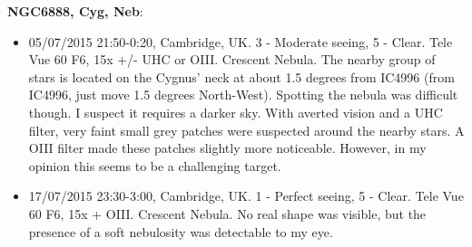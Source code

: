 {\bf NGC6888, Cyg, Neb}:
\begin{itemize}
\item 05/07/2015 21:50-0:20, Cambridge, UK. 3 - Moderate seeing, 5 - Clear. Tele Vue 60 F6, 15x +/- UHC or OIII. Crescent Nebula. The nearby group of stars is located on the Cygnus' neck at about 1.5 degrees from IC4996 (from IC4996, just move 1.5 degrees North-West). Spotting the nebula was difficult though. I suspect it requires a darker sky. With averted vision and a UHC filter, very faint small grey patches were suspected around the nearby stars. A OIII filter made these patches slightly more noticeable. However, in my opinion this seems to be a challenging target.
\item 17/07/2015 23:30-3:00, Cambridge, UK. 1 - Perfect seeing, 5 - Clear. Tele Vue 60 F6, 15x + OIII. Crescent Nebula. No real shape was visible, but the presence of a soft nebulosity was detectable to my eye.
\end{itemize}
